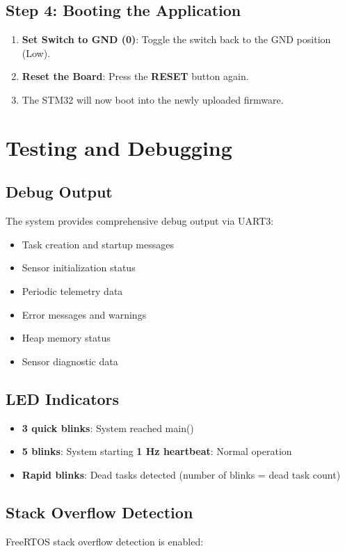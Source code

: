 \documentclass[11pt,a4paper]{article}
\begin{document}
\subsection{Step 4: Booting the Application}
\begin{enumerate}
    \item \textbf{Set Switch to GND (0)}: Toggle the switch back to the GND position (Low).
    \item \textbf{Reset the Board}: Press the \textbf{RESET} button again.
    \item The STM32 will now boot into the newly uploaded firmware.
\end{enumerate}

\section{Testing and Debugging}

\subsection{Debug Output}
The system provides comprehensive debug output via UART3:
\begin{itemize}
    \item Task creation and startup messages
    \item Sensor initialization status
    \item Periodic telemetry data
    \item Error messages and warnings
    \item Heap memory status
    \item Sensor diagnostic data
\end{itemize}

\subsection{LED Indicators}
\begin{itemize}
    \item \textbf{3 quick blinks}: System reached main()
    \item \textbf{5 blinks}: System starting
    \textbf{1 Hz heartbeat}: Normal operation
    \item \textbf{Rapid blinks}: Dead tasks detected (number of blinks = dead task count)
\end{itemize}

\subsection{Stack Overflow Detection}
FreeRTOS stack overflow detection is enabled:
\end{document}
